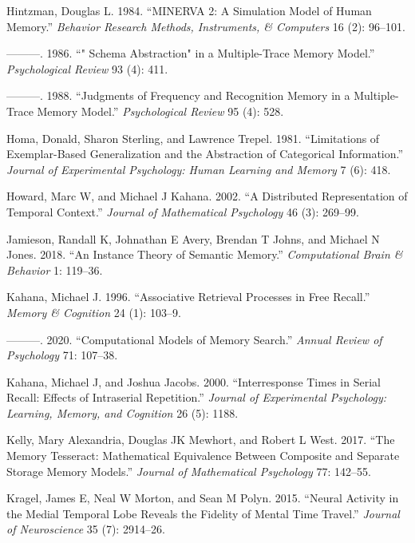 \documentclass[
  letterpaper,
  11pt,
  english,
  singlespacing,
  headsepline]{MastersDoctoralThesis}
\newlength{\cslhangindent}
\newenvironment{CSLReferences}[2] %
 {\begin{list}{}{%
  \setlength{\itemindent}{0pt}
  \setlength{\leftmargin}{0pt}
  \setlength{\parsep}{0pt}
  \ifodd #1
   \setlength{\leftmargin}{\cslhangindent}
   \setlength{\itemindent}{-1\cslhangindent}
  \fi
  \setlength{\itemsep}{#2\baselineskip}}}
 {\end{list}}
\begin{document}
\begin{CSLReferences}{1}{0}
Hintzman, Douglas L. 1984. {``MINERVA 2: A Simulation Model of Human
Memory.''} \emph{Behavior Research Methods, Instruments, \& Computers}
16 (2): 96--101.

---------. 1986. {``" Schema Abstraction" in a Multiple-Trace Memory
Model.''} \emph{Psychological Review} 93 (4): 411.

---------. 1988. {``Judgments of Frequency and Recognition Memory in a
Multiple-Trace Memory Model.''} \emph{Psychological Review} 95 (4): 528.

Homa, Donald, Sharon Sterling, and Lawrence Trepel. 1981. {``Limitations
of Exemplar-Based Generalization and the Abstraction of Categorical
Information.''} \emph{Journal of Experimental Psychology: Human Learning
and Memory} 7 (6): 418.

Howard, Marc W, and Michael J Kahana. 2002. {``A Distributed
Representation of Temporal Context.''} \emph{Journal of Mathematical
Psychology} 46 (3): 269--99.

Jamieson, Randall K, Johnathan E Avery, Brendan T Johns, and Michael N
Jones. 2018. {``An Instance Theory of Semantic Memory.''}
\emph{Computational Brain \& Behavior} 1: 119--36.

Kahana, Michael J. 1996. {``Associative Retrieval Processes in Free
Recall.''} \emph{Memory \& Cognition} 24 (1): 103--9.

---------. 2020. {``Computational Models of Memory Search.''}
\emph{Annual Review of Psychology} 71: 107--38.

Kahana, Michael J, and Joshua Jacobs. 2000. {``Interresponse Times in
Serial Recall: Effects of Intraserial Repetition.''} \emph{Journal of
Experimental Psychology: Learning, Memory, and Cognition} 26 (5): 1188.

Kelly, Mary Alexandria, Douglas JK Mewhort, and Robert L West. 2017.
{``The Memory Tesseract: Mathematical Equivalence Between Composite and
Separate Storage Memory Models.''} \emph{Journal of Mathematical
Psychology} 77: 142--55.

Kragel, James E, Neal W Morton, and Sean M Polyn. 2015. {``Neural
Activity in the Medial Temporal Lobe Reveals the Fidelity of Mental Time
Travel.''} \emph{Journal of Neuroscience} 35 (7): 2914--26.


\end{CSLReferences}
\end{document}
